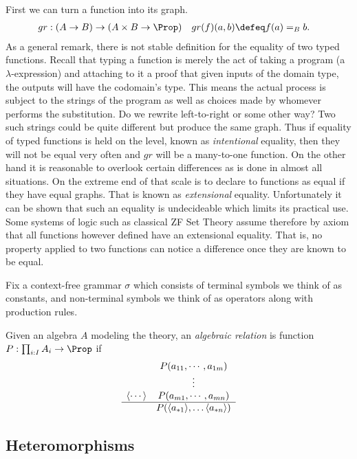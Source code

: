 First we can turn a function into its graph.
\begin{align*}
    gr&:(A\to B)\to (A\times B\to \Prop)
    & 
    gr(f)(a,b) & \defeq f(a)=_B b.
\end{align*}
As a general remark, there is not stable definition for the 
equality of two typed functions.  Recall that typing a function is 
merely the act of taking a program (a $\lambda$-expression) and 
attaching to it a proof that given inputs of the domain type, the outputs 
will have the codomain's type.  This means the actual process is subject 
to the strings of the program as well as choices made by whomever 
performs the substitution.  Do we rewrite left-to-right or some other way?
Two such strings could be quite different but produce the same graph.
Thus if equality of typed functions is held on the level, known as 
\emph{intentional} equality, then they will not be equal very often and $gr$ will be a many-to-one 
function.  On the other hand it is reasonable to overlook certain differences 
as is done in almost all situations.  On the extreme end of that scale 
is to declare to functions as equal if they have equal graphs.  That is 
known as \emph{extensional} equality.  Unfortunately it can be shown 
that such an equality is undecideable which limits its practical use.
Some systems of logic such as classical ZF Set Theory assume therefore by 
axiom that all functions however defined have an extensional equality.
That is, no property applied to two functions can notice a difference 
once they are known to be equal.


Fix a context-free grammar $\sigma$ which consists of terminal symbols 
we think of as constants, and non-terminal symbols we think of as operators
along with production rules.


Given an algebra $A$ modeling the theory,
an \emph{algebraic relation} is function $P:\prod_{i:I} A_i\to \Prop$ if 
\begin{align*}
    \begin{array}{cc}
        & P(a_{11}, \cdots, a_{1m})\\
        & \vdots \\
        \langle\cdots\rangle & P(a_{m1}, \cdots, a_{mn})\\
    \hline
       & P(\langle a_{*1}\rangle,\ldots \langle a_{*n}\rangle)
    \end{array}
\end{align*}

\subsection{Heteromorphisms}



